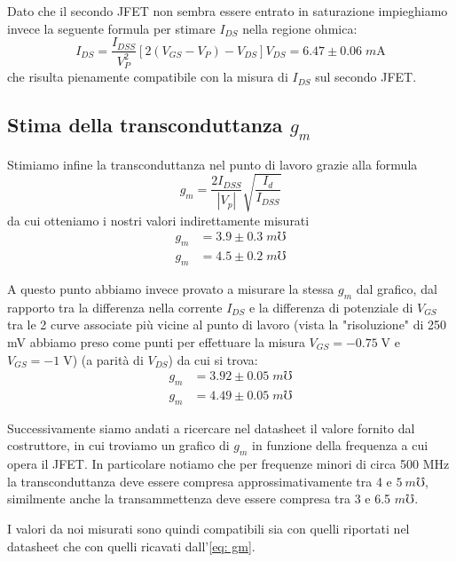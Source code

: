 \documentclass[10pt, a4paper, italian]{article}
\begin{document}
Dato che il secondo JFET non sembra essere entrato in saturazione impieghiamo
invece la seguente formula per stimare $I_{DS}$ nella regione ohmica:
\begin{equation}
I_{DS} = \frac{I_{DSS}}{V_P^2}[2(V_{GS}-V_P) - V_{DS}]V_{DS} =
6.47 \pm 0.06 \; \si{m\A}
\end{equation}
che risulta pienamente compatibile con la misura di $I_{DS}$ sul secondo JFET.

\subsection{Stima della transconduttanza $g_m$}
Stimiamo infine la transconduttanza nel punto di lavoro grazie alla formula
\begin{equation}\label{eq: gm}
g_m = \frac{2 I_{DSS}}{|V_p|}\sqrt{\frac{I_{d}}{I_{DSS}}}
\end{equation}
da cui otteniamo i nostri valori indirettamente misurati
\begin{align*}
g_m &= 3.9 \pm 0.3 \; \si{m\mho} \\
g_m &= 4.5 \pm 0.2 \; \si{m\mho}
\end{align*}

A questo punto abbiamo invece provato a misurare la stessa $g_m$ dal grafico,
dal rapporto tra la differenza nella corrente $I_{DS} $ e la differenza di
potenziale di $V_{GS}$ tra le 2 curve associate più vicine al punto di lavoro
(vista la "risoluzione" di 250 mV abbiamo preso come punti per effettuare la
misura $V_{GS}= -0.75 \; \si{\V}$ e $V_{GS}= -1 \; \si{\V}$)
(a parità di $V_{DS}$) da cui si trova:
\begin{align*}
g_m &= 3.92 \pm 0.05 \; \si{m\mho} \\
g_m &= 4.49 \pm 0.05 \; \si{m\mho}
\end{align*}

Successivamente siamo andati a ricercare nel datasheet il valore fornito dal
costruttore, in cui troviamo un grafico di $g_m$ in funzione della frequenza
a cui opera il JFET. In particolare notiamo che per frequenze minori di circa
500 MHz la transconduttanza deve essere compresa approssimativamente tra 4 e
$\SI{5}{m\mho}$, similmente anche la transammettenza deve essere compresa tra
3 e 6.5 $\si{m\mho}$.

I valori da noi misurati sono quindi compatibili sia con quelli riportati nel
datasheet che con quelli ricavati dall'\cref{eq: gm}.

\end{document}
